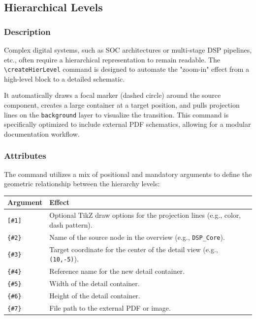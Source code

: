 \subsection{\sffamily Hierarchical Levels}

    \subsubsection{\sffamily Description}
        Complex digital systems, such as SOC architectures or multi-stage DSP pipelines, etc., often require a hierarchical representation to remain readable. The \texttt{\textbackslash createHierLevel} command is designed to automate the "zoom-in" effect from a high-level block to a detailed schematic. 
        
        It automatically draws a focal marker (dashed circle) around the source component, creates a large container at a target position, and pulls projection lines on the \texttt{background} layer to visualize the transition. This command is specifically optimized to include external PDF schematics, allowing for a modular documentation workflow.

    \subsubsection{\sffamily Attributes}
        The command utilizes a mix of positional and mandatory arguments to define the geometric relationship between the hierarchy levels:

    \begin{center}
        \begin{tabular}{lp{8cm}}
        \toprule
            \textbf{Argument} & \textbf{Effect} \\
            \midrule
            \texttt{[\#1]} & Optional TikZ draw options for the projection lines (e.g., color, dash pattern). \\
            \texttt{\{\#2\}} & Name of the source node in the overview (e.g., \texttt{DSP\_Core}). \\
            \texttt{\{\#3\}} & Target coordinate for the center of the detail view (e.g., \texttt{(10,-5)}). \\
            \texttt{\{\#4\}} & Reference name for the new detail container. \\
            \texttt{\{\#5\}} & Width of the detail container. \\
            \texttt{\{\#6\}} & Height of the detail container. \\
            \texttt{\{\#7\}} & File path to the external PDF or image. \\
            \bottomrule
        \end{tabular}
    \end{center}

